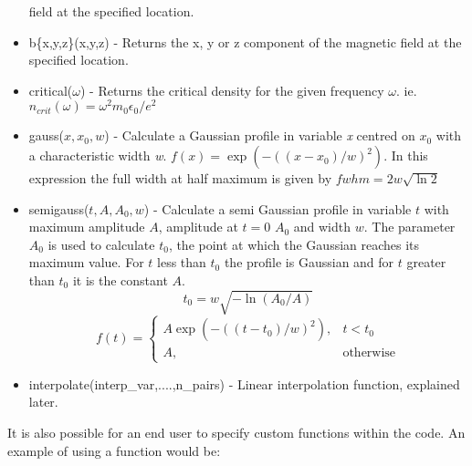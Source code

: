 \begin{itemize}
    field at the specified location.
\item b\{x,y,z\}(x,y,z) - Returns the x, y or z component of the magnetic
    field at the specified location.
\item critical($\omega$) - Returns the critical density for the given
    frequency $\omega$. ie. $n_{crit}(\omega) = \omega^2 m_0 \epsilon_0 / e^2$
\item gauss($x,x_0,w$) - Calculate a Gaussian profile in variable
    {\it x} centred on {\it $x_0$} with a characteristic width {\it w}.
    $f(x) = \exp{(-((x-x_0)/w)^2)}$. In this expression the
    full width at half maximum is given by $fwhm = 2 w \sqrt{\ln{2}}$
\item semigauss($t,A,A_0,w$) - Calculate a semi Gaussian profile in variable
    $t$ with maximum amplitude $A$, amplitude at $t=0$ $A_0$ and width $w$.
    The parameter $A_0$ is used to calculate $t_0$, the point at which the
    Gaussian reaches its maximum value. For $t$ less than $t_0$ the profile
    is Gaussian and for $t$ greater than $t_0$ it is the constant $A$.
\[
t_0 = w\sqrt{-\ln{(A_0/A)}}
\]\[
f(t) =
\begin{cases}
A \exp{(-((t-t_0)/w)^2)}, & t < t_0 \\
A, & \mbox{otherwise}
\end{cases}
\]
\item interpolate(interp\_var,....,n\_pairs) - Linear interpolation function,
  explained later.
\end{itemize}

It is also possible for an end user to specify custom functions within the
code. An example of using a function would be:\\
\indent{}\\

